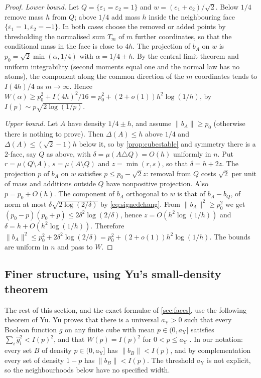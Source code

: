 \documentclass[11pt,a4paper]{article}
\numberwithin{equation}{section}
\theoremstyle{remark}
\begin{document}
\begin{proof}
\emph{Lower bound.} Let $Q=\{\varepsilon_1=\varepsilon_2=1\}$ and
$w=(e_1+e_2)/\sqrt2$. Below $1/4$ remove mass $h$ from $Q$; above $1/4$ add
mass $h$ inside the neighbouring face $\{\varepsilon_1=1,\varepsilon_2=-1\}$.
In both cases choose the removed or added points by thresholding the
normalised sum $T_m$ of $m$ further coordinates, so that the conditional mass
in the face is close to $4h$. The projection of $b_A$ on $w$ is
$p_0=\sqrt2\min(\alpha,1/4)$ with $\alpha=1/4\pm h$. By the central limit
theorem and uniform integrability (second moments equal one and the normal
law has no atoms), the component along the common direction of the $m$
coordinates tends to $I(4h)/4$ as $m\to\infty$. Hence
$W(\alpha)\ge p_0^2+I(4h)^2/16=p_0^2+(2+o(1))h^2\log(1/h)$, by
$I(p)\sim p\sqrt{2\log(1/p)}$.

\emph{Upper bound.} Let $A$ have density $1/4\pm h$, and assume
$\|b_A\|\ge p_0$ (otherwise there is nothing to prove). Then $\Delta(A)\le h$
above $1/4$ and $\Delta(A)\le(\sqrt2-1)h$ below it, so by
\cref{prop:cubestable} and symmetry there is a $2$-face, say $Q$ as above,
with $\delta=\mu(A\triangle Q)=O(h)$ uniformly in $n$. Put
$r=\mu(Q\setminus A)$, $s=\mu(A\setminus Q)$ and $z=\min(r,s)$, so that
$\delta=h+2z$. The projection $p$ of $b_A$ on $w$ satisfies
$p\le p_0-\sqrt2z$: removal from $Q$ costs $\sqrt2$ per unit of mass and
additions outside $Q$ have nonpositive projection. Also $p=p_0+O(h)$. The
component of $b_A$ orthogonal to $w$ is that of $b_A-b_Q$, of norm at most
$\delta\sqrt{2\log(2/\delta)}$ by \eqref{eq:signedchang}. From
$\|b_A\|^2\ge p_0^2$ we get $(p_0-p)(p_0+p)\le2\delta^2\log(2/\delta)$,
hence $z=O(h^2\log(1/h))$ and $\delta=h+O(h^2\log(1/h))$. Therefore
$\|b_A\|^2\le p_0^2+2\delta^2\log(2/\delta)=p_0^2+(2+o(1))h^2\log(1/h)$.
The bounds are uniform in $n$ and pass to $W$.
\end{proof}

\subsection{Finer structure, using Yu's small-density theorem}

The rest of this section, and the exact formulae of \cref{sec:faces}, use
the following theorem of Yu. Yu proves that there is a universal $a_{\mathrm Y}>0$
such that every Boolean function $g$ on any finite cube with mean
$p\in(0,a_{\mathrm Y}]$ satisfies $\sum_i\hat g_i^2<I(p)^2$, and that
$W(p)=I(p)^2$ for $0<p\le a_{\mathrm Y}$ \cite[Theorem~5, version~2]{YuLevel}. In our
notation: every set $B$ of density $p\in(0,a_{\mathrm Y}]$ has $\|b_B\|<I(p)$, and
by complementation every set of density $1-p$ has $\|b_B\|<I(p)$. The
threshold $a_{\mathrm Y}$ is not explicit, so the neighbourhoods below have no
specified width.
\end{document}
